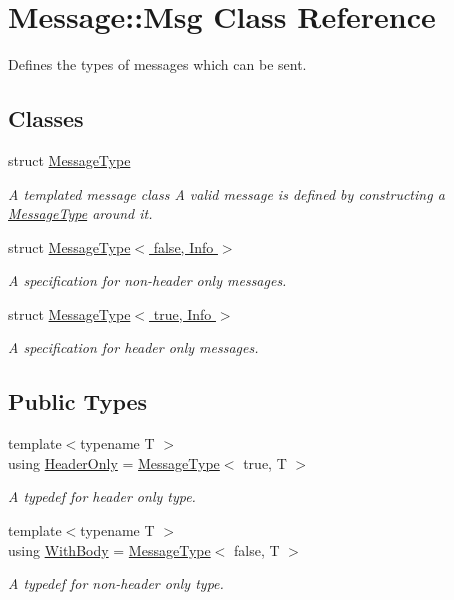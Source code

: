 \hypertarget{class_message_1_1_msg}{}\section{Message\+:\+:Msg Class Reference}
\label{class_message_1_1_msg}


Defines the types of messages which can be sent.  


\subsection*{Classes}
\begin{DoxyCompactItemize}
\item 
struct \hyperlink{struct_message_1_1_msg_1_1_message_type}{Message\+Type}
\begin{DoxyCompactList}\small\item\em A templated message class A valid message is defined by constructing a \hyperlink{struct_message_1_1_msg_1_1_message_type}{Message\+Type} around it. \end{DoxyCompactList}\item 
struct \hyperlink{struct_message_1_1_msg_1_1_message_type_3_01false_00_01_info_01_4}{Message\+Type$<$ false, Info $>$}
\begin{DoxyCompactList}\small\item\em A specification for non-\/header only messages. \end{DoxyCompactList}\item 
struct \hyperlink{struct_message_1_1_msg_1_1_message_type_3_01true_00_01_info_01_4}{Message\+Type$<$ true, Info $>$}
\begin{DoxyCompactList}\small\item\em A specification for header only messages. \end{DoxyCompactList}\end{DoxyCompactItemize}
\subsection*{Public Types}
\begin{DoxyCompactItemize}
\item 
{\footnotesize template$<$typename T $>$ }\\using \hyperlink{class_message_1_1_msg_a56cc5b2c5d898b85e97b1f3a46ab3999}{Header\+Only} = \hyperlink{struct_message_1_1_msg_1_1_message_type}{Message\+Type}$<$ true, T $>$
\begin{DoxyCompactList}\small\item\em A typedef for header only type. \end{DoxyCompactList}\item 
{\footnotesize template$<$typename T $>$ }\\using \hyperlink{class_message_1_1_msg_a385691f2f7fc10f0b4c1544b8892a6c9}{With\+Body} = \hyperlink{struct_message_1_1_msg_1_1_message_type}{Message\+Type}$<$ false, T $>$
\begin{DoxyCompactList}\small\item\em A typedef for non-\/header only type. \end{DoxyCompactList}\end{DoxyCompactItemize}
